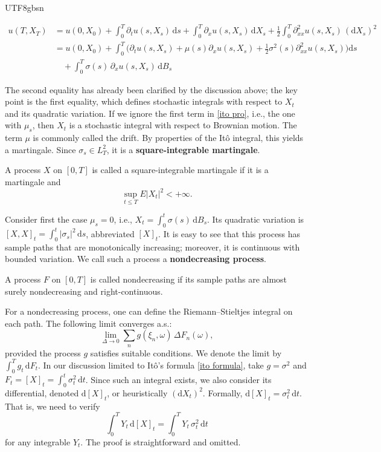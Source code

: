 \documentclass{article}
\begin{document}
\begin{CJK*}{UTF8}{gbsn}
\begin{theorem}
    $$
    \begin{aligned}
    u(T,X_T)
    &=u(0,X_0)+\int_0^T \partial_t u(s,X_s)\,\mathrm{d}s+\int_0^T \partial_x u(s,X_s)\,\mathrm{d}X_s+\frac{1}{2}\int_0^T \partial^2_{xx}u(s,X_s)\,(\mathrm{d}X_s)^2\\
    &=u(0,X_0)+\int_0^T\!\Big(\partial_t u(s,X_s)+\mu(s)\partial_x u(s,X_s)+\tfrac{1}{2}\sigma^2(s)\partial^2_{xx}u(s,X_s)\Big)\mathrm{d}s\\
    &\quad+\int_0^T \sigma(s)\,\partial_x u(s,X_s)\,\mathrm{d}B_s\label{ito formula}
    \end{aligned}
    $$
\end{theorem}

The second equality has already been clarified by the discussion above; the key point is the first equality, which defines stochastic integrals with respect to $X_t$ and its quadratic variation. If we ignore the first term in \eqref{ito pro}, i.e., the one with $\mu_s$, then $X_t$ is a stochastic integral with respect to Brownian motion. The term $\mu$ is commonly called the drift. By properties of the Itô integral, this yields a martingale. Since $\sigma_s\in L^2_T$, it is a \textbf{square-integrable martingale}.

\begin{definition}
A process $X$ on $[0,T]$ is called a square-integrable martingale if it is a martingale and
    $$
    \sup_{t\le T} E|X_t|^2<+\infty.
    $$
\end{definition}

Consider first the case $\mu_s=0$, i.e., $X_t=\int_0^t \sigma(s)\,\mathrm{d}B_s$. Its quadratic variation is $[X,X]_t=\int_0^t|\sigma_s|^2\,\mathrm{d}s$, abbreviated $[X]_t$. It is easy to see that this process has sample paths that are monotonically increasing; moreover, it is continuous with bounded variation. We call such a process a \textbf{nondecreasing process}.

\begin{definition}
A process $F$ on $[0,T]$ is called nondecreasing if its sample paths are almost surely nondecreasing and right-continuous.
\end{definition}

For a nondecreasing process, one can define the Riemann–Stieltjes integral on each path. The following limit converges a.s.:
$$
\lim_{\Delta\to0}\sum_n g(\xi_n,\omega)\,\Delta F_n(\omega),
$$
provided the process $g$ satisfies suitable conditions. We denote the limit by $\int_0^T g_t\,\mathrm{d}F_t$. In our discussion limited to Itô’s formula \eqref{ito formula}, take $g=\sigma^2$ and $F_t=[X]_t=\int_0^t \sigma_t^{2}\,\mathrm{d}t$. Since such an integral exists, we also consider its differential, denoted $\mathrm{d}[X]_t$, or heuristically $(\mathrm{d}X_t)^2$. Formally, $\mathrm{d}[X]_t=\sigma_t^2\,\mathrm{d}t$. That is, we need to verify
$$
\int_0^T Y_t\,\mathrm{d}[X]_t=
\int_0^T Y_t\,\sigma_t^2\,\mathrm{d}t
$$
for any integrable $Y_t$. The proof is straightforward and omitted.


\end{CJK*}
\end{document}
